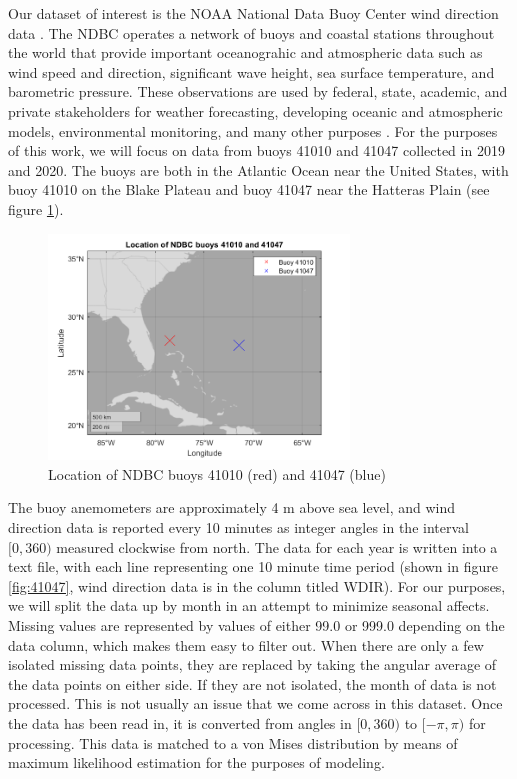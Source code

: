 \documentclass[12pt]{article}
\numberwithin{equation}{section}
\numberwithin{figure}{section}
\begin{document}
Our dataset of interest is the NOAA National Data Buoy Center wind direction data \cite{NDBC}. The NDBC operates a network of buoys and coastal stations throughout the world that provide important oceanograhic and atmospheric data such as wind speed and direction, significant wave height, sea surface temperature, and barometric pressure. These observations are used by federal, state, academic, and private stakeholders for weather forecasting, developing oceanic and atmospheric models, environmental monitoring, and many other purposes \cite{NDBCdoc}. For the purposes of this work, we will focus on data from buoys 41010 and 41047 collected in 2019 and 2020. The buoys are both in the Atlantic Ocean near the United States, with buoy 41010 on the Blake Plateau and buoy 41047 near the Hatteras Plain (see figure \ref{fig:buoys}). 

\begin{figure}[h]
\centering
\includegraphics[width=80mm]{New Folder/buoy locations.png}
\caption{Location of NDBC buoys 41010 (red) and 41047 (blue)}\label{fig:buoys}
\end{figure}

The buoy anemometers are approximately 4 m above sea level, and wind direction data is reported every 10 minutes as integer angles in the interval $[0,360)$ measured clockwise from north. The data for each year is written into a text file, with each line representing one 10 minute time period (shown in figure \ref{fig:41047}, wind direction data is in the column titled WDIR). For our purposes, we will split the data up by month in an attempt to minimize seasonal affects. Missing values are represented by values of either 99.0 or 999.0 depending on the data column, which makes them easy to filter out. When there are only a few isolated missing data points, they are replaced by taking the angular average of the data points on either side. If they are not isolated, the month of data is not processed. This is not usually an issue that we come across in this dataset. Once the data has been read in, it is converted from angles in $[0,360)$ to $[-\pi,\pi)$ for processing. This data is matched to a von Mises distribution by means of maximum likelihood estimation for the purposes of modeling. 
\end{document}
